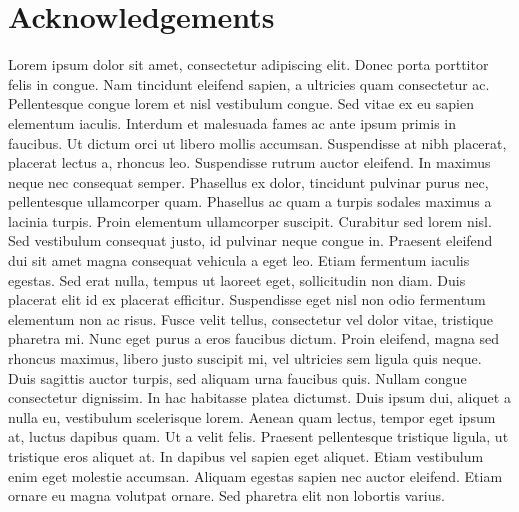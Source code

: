 \documentclass{thesis} %
\begin{document}
\chapter*{\Large Acknowledgements}
Lorem ipsum dolor sit amet, consectetur adipiscing elit. Donec porta porttitor felis in congue. Nam tincidunt eleifend sapien, a ultricies quam consectetur ac. Pellentesque congue lorem et nisl vestibulum congue. Sed vitae ex eu sapien elementum iaculis. Interdum et malesuada fames ac ante ipsum primis in faucibus. Ut dictum orci ut libero mollis accumsan. Suspendisse at nibh placerat, placerat lectus a, rhoncus leo. Suspendisse rutrum auctor eleifend. In maximus neque nec consequat semper. Phasellus ex dolor, tincidunt pulvinar purus nec, pellentesque ullamcorper quam. Phasellus ac quam a turpis sodales maximus a lacinia turpis. Proin elementum ullamcorper suscipit. Curabitur sed lorem nisl. Sed vestibulum consequat justo, id pulvinar neque congue in. Praesent eleifend dui sit amet magna consequat vehicula a eget leo. Etiam fermentum iaculis egestas. Sed erat nulla, tempus ut laoreet eget, sollicitudin non diam. Duis placerat elit id ex placerat efficitur. Suspendisse eget nisl non odio fermentum elementum non ac risus. Fusce velit tellus, consectetur vel dolor vitae, tristique pharetra mi. Nunc eget purus a eros faucibus dictum. Proin eleifend, magna sed rhoncus maximus, libero justo suscipit mi, vel ultricies sem ligula quis neque. Duis sagittis auctor turpis, sed aliquam urna faucibus quis. Nullam congue consectetur dignissim. In hac habitasse platea dictumst. Duis ipsum dui, aliquet a nulla eu, vestibulum scelerisque lorem. Aenean quam lectus, tempor eget ipsum at, luctus dapibus quam. Ut a velit felis. Praesent pellentesque tristique ligula, ut tristique eros aliquet at. In dapibus vel sapien eget aliquet. Etiam vestibulum enim eget molestie accumsan. Aliquam egestas sapien nec auctor eleifend. Etiam ornare eu magna volutpat ornare. Sed pharetra elit non lobortis varius.

\newpage
\null
\newpage
\tableofcontents     %

\newpage
\null
\newpage
\listoffigures       %

\newpage
\null
\newpage
\listoftables        %

\newpage
\null
\newpage

\printnomenclature[3cm]  %
\end{document}
